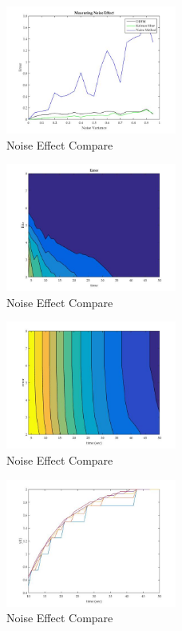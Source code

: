 \documentclass[journal]{IEEEtran}
\begin{document}
\begin{figure}[!t]
    \centering
        \includegraphics[width=0.5\textwidth]{fig2_noiseComp.jpg}
    \caption{Noise Effect Compare}
    \label{fig:noiseComp}
\end{figure}
\begin{figure}[!t]
    \centering
        \includegraphics[width=0.5\textwidth]{fig3_bitsErr.jpg}
    \caption{Noise Effect Compare}
    \label{fig:noiseComp}
\end{figure}
\begin{figure}[!t]
    \centering
        \includegraphics[width=0.5\textwidth]{fig4_bitsFiltered.jpg}
    \caption{Noise Effect Compare}
    \label{fig:noiseComp}
\end{figure}
\begin{figure}[!t]
    \centering
        \includegraphics[width=0.5\textwidth]{fig5_quant.jpg}
    \caption{Noise Effect Compare}
    \label{fig:noiseComp}
\end{figure}
\end{document}
